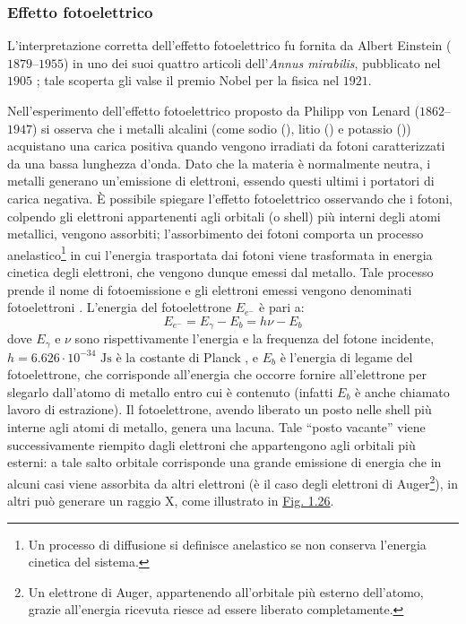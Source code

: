 \documentclass[12pt,a4paper,twoside]{report}
\begin{document}
	\subsubsection{Effetto fotoelettrico}\label{par:effetto_fotoelettrico}
	L'interpretazione corretta dell'effetto fotoelettrico fu fornita da Albert Einstein ($1879$--$1955$) in uno dei suoi quattro articoli dell'\textit{Annus mirabilis}, pubblicato nel $1905$ \cite{Einstein1905-in}; tale scoperta gli valse il premio Nobel per la fisica nel $1921$.
	
	Nell'esperimento dell'effetto fotoelettrico proposto da Philipp von Lenard ($1862$--$1947$) si osserva che i metalli alcalini (come sodio (), litio () e potassio ()) acquistano una carica positiva quando vengono irradiati da fotoni caratterizzati da una bassa lunghezza d'onda. Dato che la materia è normalmente neutra, i metalli generano un'emissione di elettroni, essendo questi ultimi i portatori di carica negativa. \`E possibile spiegare l'effetto fotoelettrico osservando che i fotoni, colpendo gli elettroni appartenenti agli orbitali (o shell) più interni degli atomi metallici, vengono assorbiti; l'assorbimento dei fotoni comporta un processo anelastico\footnote{Un processo di diffusione si definisce anelastico se non conserva l'energia cinetica del sistema.} in cui l'energia trasportata dai fotoni viene trasformata in energia cinetica degli elettroni, che vengono dunque emessi dal metallo. Tale processo prende il nome di fotoemissione e gli elettroni emessi vengono denominati fotoelettroni \cite{zucchiniNotes}. L'energia del fotoelettrone $E_{e^-}$ è pari a:
	\begin{equation}
		E_{e^-}=E_\gamma-E_b=h\nu-E_b
		\label{eq:fotoelettrico}
	\end{equation}
	dove $E_\gamma$ e $\nu$ sono rispettivamente l'energia e la frequenza del fotone incidente, $h=6.626\cdot 10^{-34}\mbox{ Js}$ è la costante di Planck \cite{planckConstant}, e $E_b$ è l'energia di legame del fotoelettrone, che corrisponde all'energia che occorre fornire all'elettrone per slegarlo dall'atomo di metallo entro cui è contenuto (infatti $E_b$ è anche chiamato lavoro di estrazione). Il fotoelettrone, avendo liberato un posto nelle shell più interne agli atomi di metallo, genera una lacuna. Tale ``posto vacante'' viene successivamente riempito dagli elettroni che appartengono agli orbitali più esterni: a tale salto orbitale corrisponde una grande emissione di energia che in alcuni casi viene assorbita da altri elettroni (è il caso degli elettroni di Auger\footnote{Un elettrone di Auger, appartenendo all'orbitale più esterno dell'atomo, grazie all'energia ricevuta riesce ad essere liberato completamente.}), in altri può generare un raggio X, come illustrato in \hyperref[fig:fotoelettrico]{Fig. 1.26}.
\end{document}
